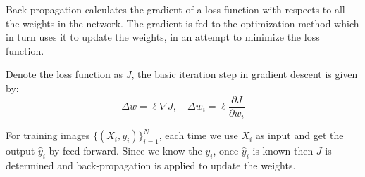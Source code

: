 \documentclass[landscape,a0paper,fontscale=0.285]{baposter} %
\begin{document}
\begin{poster}
{Back-propagation calculates the gradient of a loss function with respects to all the weights in the network.
The gradient is fed to the optimization method which in turn uses it to update the weights, in an attempt to minimize the loss function.
\vspace{5pt}

Denote the loss function as $J$, the basic iteration step in gradient descent is given by: 
\[ \Delta w = \ell \nabla J, \quad \Delta w_i = \ell \frac{\partial J}{\partial w_i} \]

For training images $ \{(X_i,y_i)\}_{i=1}^N$, each time we use $X_i$ as input and get the output $\hat{y}_i$ by feed-forward.
Since we know the $y_i$, once $\hat{y}_i$ is known then $J$ is determined and back-propagation is applied to update the weights.
}










\end{poster}
\end{document}
